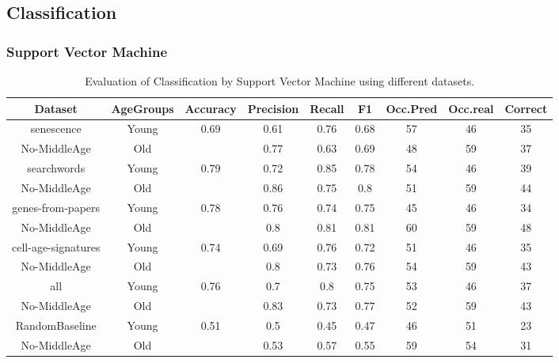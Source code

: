 \subsection*{Classification}
\subsubsection*{Support Vector Machine}
\begin{table}[H]
	\centering
	\small
	\begin{tabular}{|c|c|c|c|c|c|c|c|c|}
		\hline
		\textbf{Dataset} & \textbf{AgeGroups} & \textbf{Accuracy} & \textbf{Precision} & \textbf{Recall} & \textbf{F1} & \textbf{Occ.Pred} & \textbf{Occ.real} & \textbf{Correct} \\ \hline
		senescence & Young & 0.69 & 0.61 & 0.76 & 0.68 & 57 & 46 & 35 \\
		No-MiddleAge & Old &   & 0.77 & 0.63 & 0.69 & 48 & 59 & 37 \\
		\hline
		searchwords & Young & 0.79 & 0.72 & 0.85 & 0.78 & 54 & 46 & 39 \\
		No-MiddleAge & Old &   & 0.86 & 0.75 & 0.8 & 51 & 59 & 44 \\
		\hline
		genes-from-papers & Young & 0.78 & 0.76 & 0.74 & 0.75 & 45 & 46 & 34 \\
		No-MiddleAge & Old &   & 0.8 & 0.81 & 0.81 & 60 & 59 & 48 \\
		\hline
		cell-age-signatures & Young & 0.74 & 0.69 & 0.76 & 0.72 & 51 & 46 & 35 \\
		No-MiddleAge & Old &   & 0.8 & 0.73 & 0.76 & 54 & 59 & 43 \\
		\hline
		all & Young & 0.76 & 0.7 & 0.8 & 0.75 & 53 & 46 & 37 \\
		No-MiddleAge & Old &   & 0.83 & 0.73 & 0.77 & 52 & 59 & 43 \\
		\hline
		RandomBaseline & Young & 0.51 & 0.5 & 0.45 & 0.47 & 46 & 51 & 23 \\
		No-MiddleAge & Old &   & 0.53 & 0.57 & 0.55 & 59 & 54 & 31 \\
		\hline
	\end{tabular}
	\caption{Evaluation of Classification by Support Vector Machine using different datasets.}
	\label{tab:ClassificationSupport Vector MachineNo-MiddleAge}
\end{table}